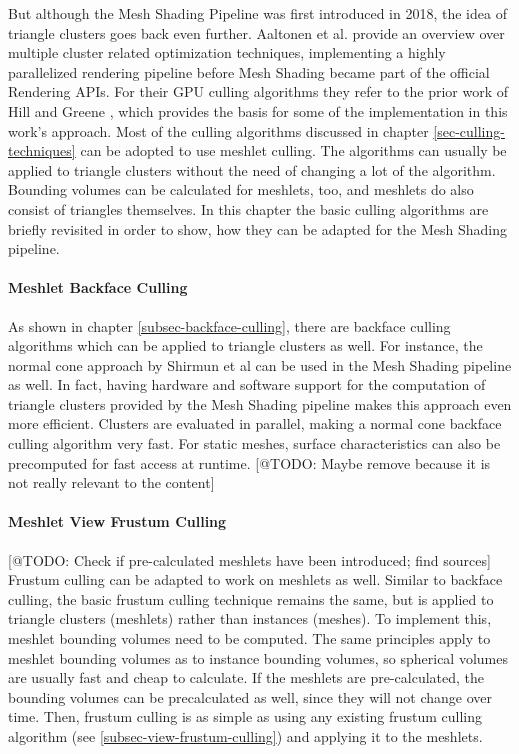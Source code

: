 \noindent
But although the Mesh Shading Pipeline was first introduced in 2018, the idea of triangle clusters goes back even further.
Aaltonen et al. \cite{Aaltonen2015} provide an overview over multiple cluster related optimization techniques, implementing 
a highly parallelized rendering pipeline before Mesh Shading became part of the official Rendering \ac{API}s.
For their \ac{GPU} culling algorithms they refer to the prior work of Hill \cite{Hill11} and Greene \cite{Greene93}, which 
provides the basis for some of the implementation in this work's approach. Most of the culling algorithms discussed in chapter 
\ref{sec-culling-techniques} can be adopted to use meshlet culling. The algorithms can usually be applied to triangle clusters 
without the need of changing a lot of the algorithm. Bounding volumes can be calculated for meshlets, too, and meshlets do also 
consist of triangles themselves. In this chapter the basic culling algorithms are briefly revisited in order to show, how they 
can be adapted for the Mesh Shading pipeline.


\paragraph*{Meshlet Backface Culling} \label{subsubsec-meshlet-backface-culling}

As shown in chapter \ref{subsec-backface-culling}, there are backface culling algorithms which can be applied to 
triangle clusters as well. For instance, the normal cone approach by Shirmun et al \cite{Shirmun1993} can be used 
in the Mesh Shading pipeline as well. In fact, having hardware and software support for the computation of triangle 
clusters provided by the Mesh Shading pipeline makes this approach even more efficient. Clusters are evaluated in 
parallel, making a normal cone backface culling algorithm very fast. For static meshes, surface characteristics can 
also be precomputed for fast access at runtime. [@TODO: Maybe remove because it is not really relevant to the content]

\paragraph*{Meshlet View Frustum Culling} \label{subsubsec-meshlet-view-frustum-culling}

[@TODO: Check if pre-calculated meshlets have been introduced; find sources]
Frustum culling can be adapted to work on meshlets as well. Similar to backface culling, the basic frustum culling 
technique remains the same, but is applied to triangle clusters (meshlets) rather than instances (meshes). To 
implement this, meshlet bounding volumes need to be computed. The same principles apply to meshlet bounding volumes 
as to instance bounding volumes, so spherical volumes are usually fast and cheap to calculate. If the meshlets are 
pre-calculated, the bounding volumes can be precalculated as well, since they will not change over time. Then, frustum 
culling is as simple as using any existing frustum culling algorithm (see \ref{subsec-view-frustum-culling}) and 
applying it to the meshlets. \\

